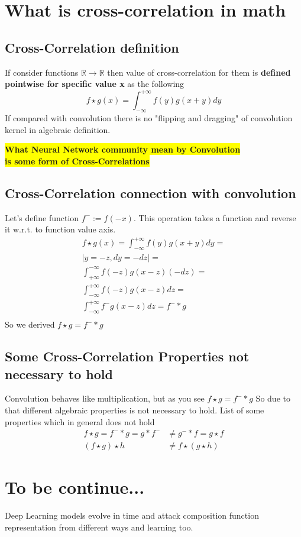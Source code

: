 \documentclass[12pt,a4paper]{article}
\theoremstyle{plain}
\begin{document}
\section{What is cross-correlation in math}
\subsection{Cross-Correlation definition}
If consider functions $\mathbb{R} \to \mathbb{R}$ then value of cross-correlation for them is \textbf{defined pointwise for specific value x} as the following
\begin{equation}\label{cross-correlation}
f \star g(x)=\int^{+\infty}_{-\infty} f(y)g(x+y)dy
\end{equation}
If compared with convolution there is no "flipping and dragging" of convolution kernel in algebraic definition.
\begin{flushleft}
 \colorbox{yellow}{\textbf{What Neural Network community mean by Convolution}}\\
 \colorbox{yellow}{\textbf{is some form of Cross-Correlations}}
\end{flushleft}
\subsection{Cross-Correlation connection with convolution}
Let's define function $f^{-}:=f(-x)$. This operation takes a function and reverse it w.r.t. to function value axis.
\begin{multline}
f \star g(x)=\int^{+\infty}_{-\infty} f(y)g(x+y)dy=\\
|y=-z,dy=-dz|=\\
\int^{-\infty}_{+\infty} f(-z)g(x-z)(-dz)=\\
\int^{+\infty}_{-\infty} f(-z)g(x-z)dz=\\
\int^{+\infty}_{-\infty} f^{-}g(x-z)dz=f^{-}*g\\
\end{multline}
So we derived $f \star g=f^{-}*g$
\subsection{Some Cross-Correlation Properties not necessary to hold}
Convolution behaves like multiplication, but as you see $f \star g=f^{-}*g$
So due to that different algebraic properties is not necessary to hold.
List of some properties which in general does not hold
\begin{align}
f \star g =f^-*g = g*f^- &\ne g^-*f= g \star f\\
(f \star g) \star h &\ne f \star (g \star h)
\end{align}
\section{To be continue...}
Deep Learning models evolve in time and attack composition function representation from different ways and learning too.
\end{document}
